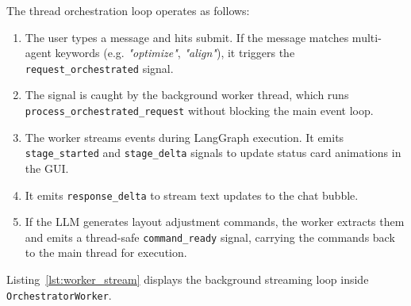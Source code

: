 The thread orchestration loop operates as follows:
\begin{enumerate}
    \item The user types a message and hits submit. If the message matches multi-agent keywords (e.g. \emph{"optimize"}, \emph{"align"}), it triggers the \texttt{request\_}\allowbreak\texttt{orchestrated} signal.
    \item The signal is caught by the background worker thread, which runs \texttt{process\_}\allowbreak\texttt{orchestrated\_}\allowbreak\texttt{request} without blocking the main event loop.
    \item The worker streams events during LangGraph execution. It emits \texttt{stage\_}\allowbreak\texttt{started} and \texttt{stage\_}\allowbreak\texttt{delta} signals to update status card animations in the GUI.
    \item It emits \texttt{response\_}\allowbreak\texttt{delta} to stream text updates to the chat bubble.
    \item If the LLM generates layout adjustment commands, the worker extracts them and emits a thread-safe \texttt{command\_}\allowbreak\texttt{ready} signal, carrying the commands back to the main thread for execution.
\end{enumerate}

Listing~\ref{lst:worker_stream} displays the background streaming loop inside \texttt{Orchestrator}\allowbreak\texttt{Worker}.

